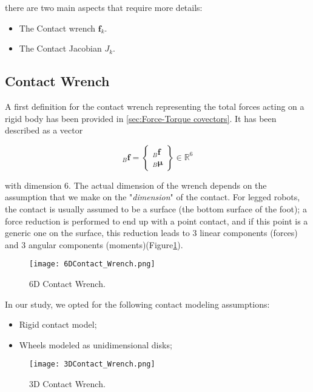 there are two main aspects that require more details:

    \begin{itemize}
        \item The Contact wrench $\mathbf{f}_{k}$.
        \item The Contact Jacobian $J_{k}$.
    \end{itemize}

\subsection{Contact Wrench}
\label{subsec:Contact Wrench}

A first definition for the contact wrench representing the total forces acting on a rigid body has been provided in \cref{sec:Force-Torque covectors}.
It has been described as a vector 

\begin{equation}
    {}_{B}\mathbf{f} = 
    \begin{Bmatrix}
    {}_{B}\bm{f} \\
    {}_{B}\bm{\mu}
    \end{Bmatrix} \in \mathbb{R}^{6}
\end{equation}

with dimension 6.
The actual dimension of the wrench depends on the assumption that we make on the "\textit{dimension}" of the contact.
For legged robots, the contact is usually assumed to be a surface (the bottom surface of the foot); a force reduction is performed to end up with a point contact, and if this point is a generic one on the surface, this reduction leads to 3 linear components (forces) and 3 angular components (moments)(Figure\ref{fig:6DContact_Wrench}).


\begin{figure}
    \centering
    \texttt{[image: 6DContact\_Wrench.png]}
    \caption{6D Contact Wrench.}
    \label{fig:6DContact_Wrench}
\end{figure}

In our study, we opted for the following contact modeling assumptions:

\begin{itemize}
    \item Rigid contact model;
    \item Wheels modeled as unidimensional disks;
\end{itemize}

\begin{figure}[H]
    \centering
    \texttt{[image: 3DContact\_Wrench.png]}
    \caption{3D Contact Wrench.}
    \label{fig:3DContact_Wrench}
\end{figure}


